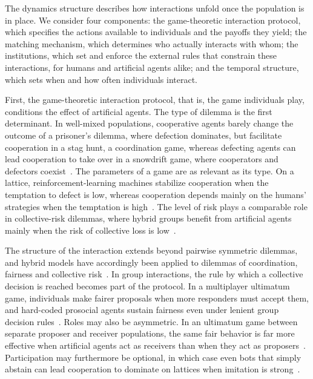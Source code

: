
The dynamics structure describes how interactions unfold once the population is in place. We consider four components: the game-theoretic interaction protocol, which specifies the actions available to individuals and the payoffs they yield; the matching mechanism, which determines who actually interacts with whom; the institutions, which set and enforce the external rules that constrain these interactions, for humans and artificial agents alike; and the temporal structure, which sets when and how often individuals interact.


First, the game-theoretic interaction protocol, that is, the game individuals play, conditions the effect of artificial agents. The type of dilemma is the first determinant. In well-mixed populations, cooperative agents barely change the outcome of a prisoner's dilemma, where defection dominates, but facilitate cooperation in a stag hunt, a coordination game, whereas defecting agents can lead cooperation to take over in a snowdrift game, where cooperators and defectors coexist~\cite{guoFacilitatingCooperationHumanagent2023}. The parameters of a game are as relevant as its type. On a lattice, reinforcement-learning machines stabilize cooperation when the temptation to defect is low, whereas cooperation depends mainly on the humans' strategies when the temptation is high~\cite{quanHumanMachineCooperation2026}. The level of risk plays a comparable role in collective-risk dilemmas, where hybrid groups benefit from artificial agents mainly when the risk of collective loss is low~\cite{terruchaArtCompensationHow2024}.

The structure of the interaction extends beyond pairwise symmetric dilemmas, and hybrid models have accordingly been applied to dilemmas of coordination, fairness and collective risk~\cite{hanSocialPhysicsAge2026}. In group interactions, the rule by which a collective decision is reached becomes part of the protocol. In a multiplayer ultimatum game, individuals make fairer proposals when more responders must accept them, and hard-coded prosocial agents sustain fairness even under lenient group decision rules~\cite{santosEvolutionCollectiveFairness2019}. Roles may also be asymmetric. In an ultimatum game between separate proposer and receiver populations, the same fair behavior is far more effective when artificial agents act as receivers than when they act as proposers~\cite{songEvolutionFairnessHybrid2026}. Participation may furthermore be optional, in which case even bots that simply abstain can lead cooperation to dominate on lattices when imitation is strong~\cite{sharmaSmallBotsBig2023}.

